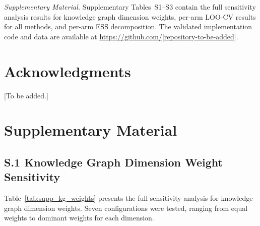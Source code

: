 \documentclass[12pt]{article}
\begin{document}
\vspace{12pt}
\noindent\textit{Supplementary Material.}
Supplementary Tables~S1--S3 contain the full sensitivity analysis results for knowledge graph dimension weights, per-arm LOO-CV results for all methods, and per-arm ESS decomposition. The validated implementation code and data are available at \url{https://github.com/[repository-to-be-added]}.

\section*{Acknowledgments}

[To be added.]




\clearpage
\appendix
\setcounter{table}{0}
\renewcommand{\thetable}{S\arabic{table}}
\setcounter{figure}{0}
\renewcommand{\thefigure}{S\arabic{figure}}

\section*{Supplementary Material}

\subsection*{S.1 Knowledge Graph Dimension Weight Sensitivity}

Table~\ref{tab:supp_kg_weights} presents the full sensitivity analysis for knowledge graph dimension weights. Seven configurations were tested, ranging from equal weights to dominant weights for each dimension.
\end{document}
